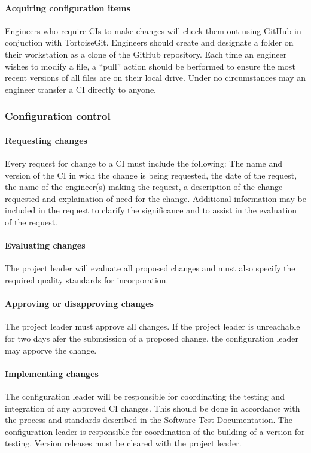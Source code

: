 \documentclass{scrartcl}
\begin{document}
\paragraph{Acquiring configuration items}
Engineers who require CIs to make changes will check them out using GitHub in conjuction with TortoiseGit.
Engineers should create and designate a folder on their workstation as a clone of the GitHub repository.  Each time an engineer wishes to modify a file, a ``pull'' action should be berformed to ensure the most recent versions of all files are on their local drive.  Under no circumstances may an engineer transfer a CI directly to anyone.

\subsubsection{Configuration control}
\paragraph{Requesting changes}
Every request for change to a CI must include the following: The name and version of the CI in wich the change is being requested,  the date of the request, the name of the engineer(s) making the request, a description of the change requested and explaination of need for the change.  Additional information may be included in the request to clarify the significance and to assist in the evaluation of the request.

\paragraph{Evaluating changes}
The project leader will evaluate all proposed changes and must also specify the required quality standards for incorporation.
\paragraph{Approving or disapproving changes}
The project leader must approve all changes.  If the project leader is unreachable for two days afer the submsission of a proposed change, the configuration leader may apporve the change.
\paragraph{Implementing changes}
The configuration leader will be responsible for coordinating the testing and integration of any approved CI changes.  This should be done in accordance with the process  and standards described in the Software Test Documentation.  The configuration leader is responsible for coordination of the building of a version for testing.  Version releases must be cleared with the project leader.
\end{document}
